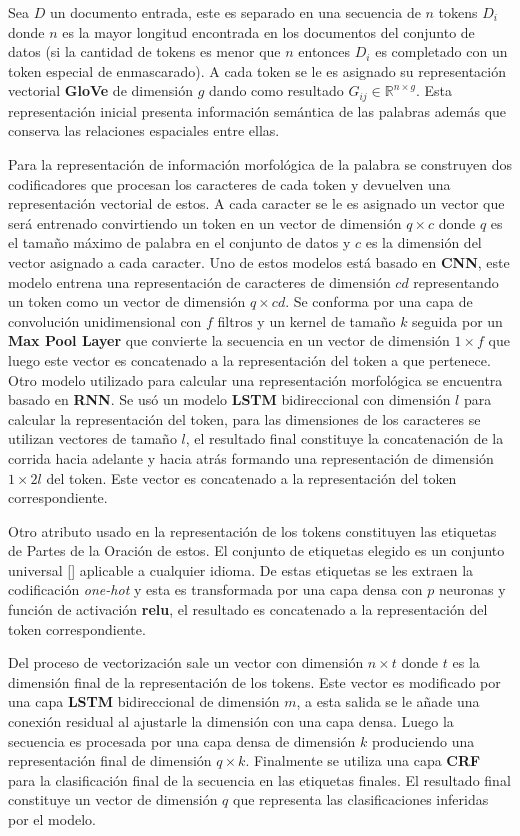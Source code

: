 Sea $D$ un documento entrada, este es separado en una secuencia de $n$ tokens $D_i$ donde $n$ es la mayor longitud encontrada
en los documentos del conjunto de datos (si la cantidad de tokens es menor que $n$ entonces $D_i$ es completado con un token especial de enmascarado). 
A cada token se le es asignado
su representación vectorial \textbf{GloVe} de dimensión $g$ dando como resultado $G_{ij} \in \mathbb{R}^{n \times g}$.
Esta representación inicial presenta información semántica de las palabras además que conserva las relaciones 
espaciales entre ellas. 

Para la representación de información morfológica de la palabra se construyen dos
codificadores que procesan los caracteres de cada token y devuelven una representación vectorial de estos.
A cada caracter se le es asignado un vector que será entrenado convirtiendo un token en un vector de dimensión
$q \times c$ donde $q$ es el tamaño máximo de palabra en el conjunto de datos y $c$ es la dimensión del vector
asignado a cada caracter.
Uno de estos modelos está basado en \textbf{CNN}, este modelo entrena una representación de caracteres de dimensión
$cd$ representando un token como un vector de dimensión $q \times cd$. Se conforma por una capa de convolución unidimensional
con $f$ filtros y un kernel de tamaño $k$ seguida por un \textbf{Max Pool Layer} que convierte la secuencia en un vector
de dimensión $1 \times f$ que luego este vector es concatenado a la representación del token a que pertenece.
Otro modelo utilizado para calcular una representación morfológica se encuentra basado en \textbf{RNN}. Se usó
un modelo \textbf{LSTM} bidireccional con dimensión $l$ para calcular la representación del token, para las dimensiones de los caracteres se
utilizan vectores de tamaño $l$, el resultado final constituye la concatenación de la corrida hacia adelante y
hacia atrás formando una representación de dimensión $1 \times 2l$ del token. Este vector es concatenado a la representación
del token correspondiente.

Otro atributo usado en la representación de los tokens constituyen las etiquetas de Partes de la Oración de estos.
El conjunto de etiquetas elegido es un conjunto universal [\cite{petrov2011universal}] aplicable a cualquier idioma.
De estas etiquetas se les extraen la codificación \emph{one-hot} y esta es transformada por una capa densa con $p$ neuronas
y función de activación \textbf{relu}, el resultado es concatenado a la representación del token correspondiente.

Del proceso de vectorización sale un vector con dimensión $n \times t$ donde $t$ es la dimensión final de la representación
de los tokens. Este vector es modificado por una capa \textbf{LSTM} bidireccional de dimensión $m$, a esta salida se le 
añade una conexión residual al ajustarle la dimensión con una capa densa. Luego la secuencia es procesada por una 
capa densa de dimensión $k$ produciendo una representación final de dimensión $q \times k$.
Finalmente se utiliza una capa \textbf{CRF}
para la clasificación final de la secuencia en las etiquetas finales. El resultado final constituye un vector
de dimensión $q$ que representa las clasificaciones inferidas por el modelo.

